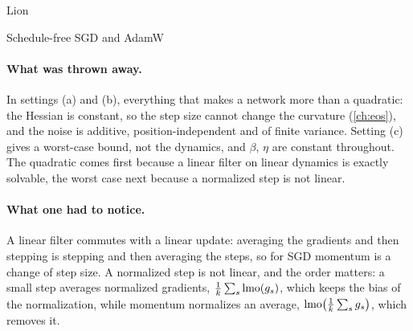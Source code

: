 \begin{refsection}
\begin{fieldguide}{Lion}{\textcite{ChenEtAl2023}}
\end{fieldguide}

\begin{fieldguide}{Schedule-free SGD and AdamW}{\textcite{DefazioEtAl2024}}
\end{fieldguide}

\paragraph{What was thrown away.} In settings (a) and (b), everything that makes a network more than a quadratic: the Hessian is constant, so the step size cannot change the curvature (\cref{ch:eos}), and the noise is additive, position-independent and of finite variance. Setting (c) gives a worst-case bound, not the dynamics, and $\beta$, $\eta$ are constant throughout. The quadratic comes first because a linear filter on linear dynamics is exactly solvable, the worst case next because a normalized step is not linear.

\paragraph{What one had to notice.} A linear filter commutes with a linear update: averaging the gradients and then stepping is stepping and then averaging the steps, so for SGD momentum is a change of step size. A normalized step is not linear, and the order matters: a small step averages normalized gradients, $\frac1k\sum_s\operatorname{lmo}(g_s)$, which keeps the bias of the normalization, while momentum normalizes an average, $\operatorname{lmo}\bigl(\frac1k\sum_sg_s\bigr)$, which removes it.


\end{refsection}
